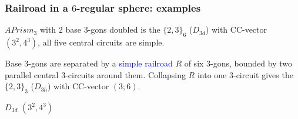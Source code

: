 \documentclass{beamer}
\begin{document}
\begin{frame}
\end{frame}   

\begin{frame}\frametitle{Railroad in a $6$-regular sphere: examples}
\vspace{-2.5mm}
$APrism_3$ with $2$ base $3$-gons doubled is the  $\{2,3\}_6$ ($D_{3d}$) 
with  
CC-vector 
$(3^2,4^3)$, all five central circuits are simple.

Base $3$-gons are separated by a \textcolor{blue}{simple railroad} {\bf $R$} of six  $3$-gons, 
bounded by two parallel central $3$-circuits around them.   
Collapsing  {\bf $R$}  into one $3$-circuit gives
the  $\{2,3\}_3$ ($D_{3h}$)
with
CC-vector
$(3;6)$. 
\begin{center}
\begin{minipage}[b]{28mm}
\centering   
{}\par
$D_{3d}$ $(3^2,4^3)$
\end{minipage}
\begin{minipage}[b]{28mm}
\centering
{}\par

\end{minipage}
\end{center}
\end{frame}
\end{document}
